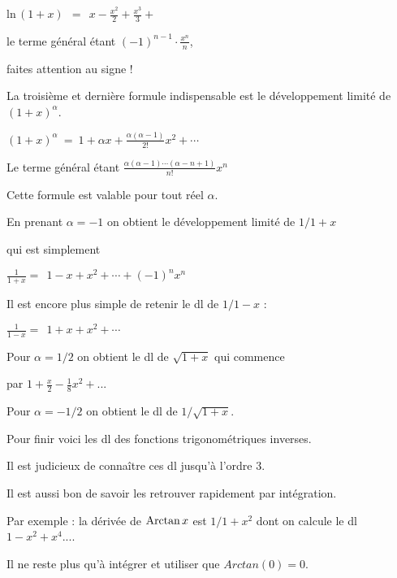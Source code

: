 $\text{ln}\, (1+x)\ \ =\ \  x - \frac{x^2}{2}+\frac{x^3}{3}+$

le terme général étant $(-1)^{n-1}\cdot\frac{x^n}{n}$,

faites attention au signe !



\diapo

La troisième et dernière formule indispensable est le développement
limité de $(1+x)^\alpha$.

$(1+x)^\alpha \ =\   1 + \alpha x + \frac{\alpha(\alpha - 1)}{2!}x^2+ \cdots$

Le terme général étant $\frac {\alpha(\alpha-1)\cdots(\alpha - n+1)}{n!} x^n$



Cette formule est valable pour tout réel $\alpha$.


En prenant $\alpha=-1$ on obtient le développement limité de $1/1+x$

qui est simplement 

$\frac{1}{1+x}  =\ \ 1 -x+x^2+\cdots+(-1)^n x^n\ $

Il est encore plus simple de retenir le dl de $1/1-x$ :

$\frac{1}{1-x}  =\ \ 1 + x+x^2+ \cdots$

Pour $\alpha=1/2$ on obtient le dl de $\sqrt{1+x}$ qui commence

par $1 + \frac{x}{2} - \frac{1}{8}x^2+ ...$

Pour $\alpha=-1/2$ on obtient le dl de $1/\sqrt{1+x}$.



\diapo

Pour finir voici les dl des fonctions trigonométriques inverses.

Il est judicieux de connaître ces dl jusqu'à l'ordre $3$.

Il est aussi bon de savoir les retrouver rapidement
par intégration.

Par exemple : la dérivée de $\mathop{\mathrm{Arctan}}\nolimits x$ est $1/1+x^2$
dont on calcule le dl $1-x^2+x^4...$. 

Il ne reste plus qu'à intégrer 
et utiliser que $Arctan(0)=0$.





